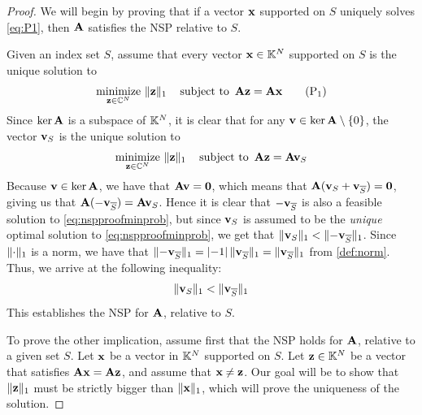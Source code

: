 \begin{proof}
	We will begin by proving that if a vector $ \mathbf{x} $ supported on $ S $ uniquely solves \eqref{eq:P1}, then $ \mathbf{A} $ satisfies the NSP relative to $ S $.
	
	Given an index set $ S $, assume that every vector $ \mathbf{x} \in \mathbb{K}^{N} $ supported on $ S $ is the unique solution to
	\[
		\underset{\mathbf{z} \in \mathbb{C}^{N}}{\text{minimize}}~ \lVert\mathbf{z}\rVert_1
		\quad\operatorname*{subject~to}~ \mathbf{A}\mathbf{z} = \mathbf{A}\mathbf{x}
		\tag{P$_1$}
	\]
	Since $ \ker\mathbf{A} $ is a subspace of $ \mathbb{K}^{N} $, it is clear that for any $ \mathbf{v} \in \ker\mathbf{A}\setminus\{0\} $, the vector $ \mathbf{v}_{S} $ is the unique solution to 
	\begin{equation}
		\label{eq:nspproofminprob}
		\underset{\mathbf{z} \in \mathbb{C}^{N}}{\text{minimize}}~ \lVert\mathbf{z}\rVert_1
		\quad\operatorname*{subject~to}~ \mathbf{A}\mathbf{z} = \mathbf{A}\mathbf{v}_{S}
	\end{equation}
	Because $ \mathbf{v} \in \ker\mathbf{A} $, we have that $ \mathbf{A}\mathbf{v} = \mathbf{0} $, which means that $ \mathbf{A}(\mathbf{v}_{S} + \mathbf{v}_{\overline{S}}) = \mathbf{0} $, giving us that $ \mathbf{A}(-\mathbf{v}_{\overline{S}}) = \mathbf{A}\mathbf{v}_{S} $. Hence it is clear that $ -\mathbf{v}_{\overline{S}} $ is also a feasible solution to \eqref{eq:nspproofminprob}, but since $ \mathbf{v}_{S} $ is assumed to be the \textit{unique} optimal solution to \eqref{eq:nspproofminprob}, we get that $ \lVert\mathbf{v}_{S}\rVert_{1} < \lVert-\mathbf{v}_{\overline{S}}\rVert_{1} $. Since $ \lVert\cdot\rVert_{1} $ is a norm, we have that $ \lVert-\mathbf{v}_{\overline{S}}\rVert_{1} = \left|-1\right|\lVert\mathbf{v}_{\overline{S}}\rVert_{1} = \lVert\mathbf{v}_{\overline{S}}\rVert_{1} $ from \cref{def:norm}. Thus, we arrive at the following inequality:
	\[
		\lVert\mathbf{v}_{S}\rVert_{1} < \lVert\mathbf{v}_{\overline{S}}\rVert_{1}
	\]
	This establishes the NSP for $ \mathbf{A} $, relative to $ S $.
	
	To prove the other implication, assume first that the NSP holds for $ \mathbf{A} $, relative to a given set $ S $. Let $ \mathbf{x} $ be a vector in $ \mathbb{K}^{N} $ supported on $ S $. Let $ \mathbf{z} \in \mathbb{K}^{N} $ be a vector that satisfies $ \mathbf{A}\mathbf{x} = \mathbf{A}\mathbf{z} $, and assume that $ \mathbf{x} \neq \mathbf{z} $. Our goal will be to show that $ \lVert\mathbf{z}\rVert_{1} $ must be strictly bigger than $ \lVert\mathbf{x}\rVert_{1} $, which will prove the uniqueness of the solution. 
	

\end{proof}
